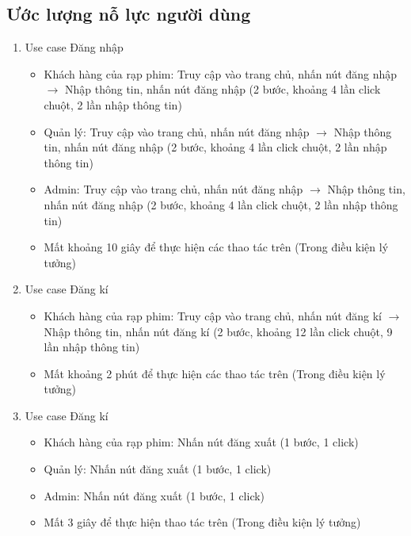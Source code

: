 \documentclass[a4paper, 12pt]{article}
\begin{document}
    \subsection{Ước lượng nỗ lực người dùng}
    \begin{enumerate}
        \item Use case Đăng nhập
        \begin{itemize}
            \item Khách hàng của rạp phim: Truy cập vào trang chủ, nhấn nút đăng nhập $\rightarrow$ Nhập thông tin, nhấn nút đăng nhập (2 bước, khoảng 4 lần click chuột, 2 lần nhập thông tin)
            \item Quản lý: Truy cập vào trang chủ, nhấn nút đăng nhập $\rightarrow$ Nhập thông tin, nhấn nút đăng nhập (2 bước, khoảng 4 lần click chuột, 2 lần nhập thông tin)
            \item Admin: Truy cập vào trang chủ, nhấn nút đăng nhập $\rightarrow$ Nhập thông tin, nhấn nút đăng nhập (2 bước, khoảng 4 lần click chuột, 2 lần nhập thông tin)
            \item Mất khoảng 10 giây để thực hiện các thao tác trên (Trong điều kiện lý tưởng)
        \end{itemize}

        \item Use case Đăng kí
        \begin{itemize}
            \item Khách hàng của rạp phim: Truy cập vào trang chủ, nhấn nút đăng kí $\rightarrow$ Nhập thông tin, nhấn nút đăng kí (2 bước, khoảng 12 lần click chuột, 9 lần nhập thông tin)
            \item Mất khoảng 2 phút để thực hiện các thao tác trên (Trong điều kiện lý tưởng)
        \end{itemize}

        \item Use case Đăng kí
        \begin{itemize}
            \item Khách hàng của rạp phim: Nhấn nút đăng xuất (1 bước, 1 click)
            \item Quản lý: Nhấn nút đăng xuất (1 bước, 1 click)
            \item Admin: Nhấn nút đăng xuất (1 bước, 1 click)
            \item Mất 3 giây để thực hiện thao tác trên (Trong điều kiện lý tưởng)
        \end{itemize}


\end{enumerate}
\end{document}
